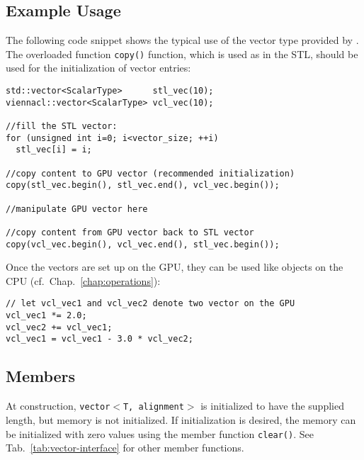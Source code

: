 \subsection{Example Usage}
The following code snippet shows the typical use of the vector type provided by
{\ViennaCL}. The overloaded function \texttt{copy()} function, which is used as
in the STL, should be used for the initialization of vector entries:
\begin{lstlisting}
std::vector<ScalarType>      stl_vec(10);
viennacl::vector<ScalarType> vcl_vec(10);

//fill the STL vector:
for (unsigned int i=0; i<vector_size; ++i)
  stl_vec[i] = i;

//copy content to GPU vector (recommended initialization)
copy(stl_vec.begin(), stl_vec.end(), vcl_vec.begin());

//manipulate GPU vector here

//copy content from GPU vector back to STL vector
copy(vcl_vec.begin(), vcl_vec.end(), stl_vec.begin());
\end{lstlisting}


Once the vectors are set up on the GPU, they can be used like objects on the CPU
(cf.~Chap.~\ref{chap:operations}):
\begin{lstlisting}
// let vcl_vec1 and vcl_vec2 denote two vector on the GPU
vcl_vec1 *= 2.0;
vcl_vec2 += vcl_vec1;
vcl_vec1 = vcl_vec1 - 3.0 * vcl_vec2;
\end{lstlisting}

\subsection{Members}
At construction, \texttt{vector$<$T, alignment$>$} is initialized to have the
supplied length, but memory is not initialized. If initialization is desired,
the memory can be initialized with zero values using the member function
\lstinline|clear()|. See
Tab.~\ref{tab:vector-interface} for other member functions.



